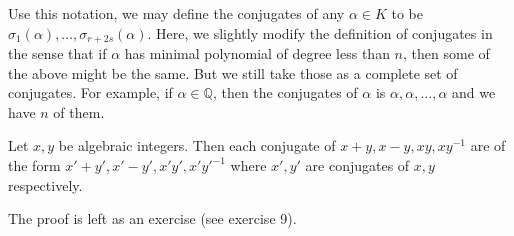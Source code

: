 Use this notation, we may define the conjugates of any $\alpha \in K$ to be $\sigma_1(\alpha),\ldots,\sigma_{r+2s}(\alpha)$. Here, we slightly modify the definition of conjugates in the sense that if $\alpha$ has minimal polynomial of degree less than $n$, then some of the above might be the same. But we still take those as a complete set of conjugates. For example, if $\alpha \in \mathbb{Q}$, then the conjugates of $\alpha$ is $\alpha,\alpha,\ldots,\alpha$ and we have $n$ of them.

\begin{proposition} Let $x,y$ be algebraic integers. Then each conjugate of $x+y,x-y,xy,xy^{-1}$ are of the form
$x'+y',x'-y',x'y',x'y'^{-1}$ where $x',y'$ are conjugates of $x,y$ respectively.
\end{proposition}
The proof is left as an exercise (see exercise 9).
